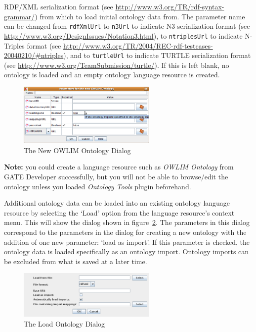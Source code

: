 \begin{itemize}
  RDF/XML serialization format (see \url{http://www.w3.org/TR/rdf-syntax-grammar/}) from which
  to load initial ontology data from. The parameter name can be changed
  from \texttt{rdfXmlUrl} to \texttt{n3Url} to indicate N3 serialization
  format (see \url{http://www.w3.org/DesignIssues/Notation3.html}), 
  to \texttt{ntriplesUrl}  to indicate N-Triples format 
  (see \url{http://www.w3.org/TR/2004/REC-rdf-testcases-20040210/#ntriples}), 
  and to \texttt{turtleUrl} to indicate TURTLE serialization format
  (see \url{http://www.w3.org/TeamSubmission/turtle/}).
  If this is left blank, no ontology is loaded and an empty ontology
  language resource is created.
\end{itemize}


\begin{figure}[!htbp]
\begin{center}
\includegraphics[width=0.6\textwidth]{ontology_lrowlim_new.png}
\caption{The New OWLIM Ontology Dialog}
\label{fig:ontology_lrowlim_new}
\end{center}
\end{figure}

\textbf{Note:} you could create a language resource such as 
\emph{OWLIM Ontology} from GATE Developer successfully, but you 
will not be able to browse/edit the ontology unless you loaded 
\emph{Ontology Tools} plugin beforehand.

Additional ontology data can be loaded into an existing ontology
language resource by selecting the `Load' option from the 
language resource's context menu. This will show the 
dialog shown in figure~\ref{fig:ontology_lr_load}.
The parameters in this dialog correspond to the parameters in the 
dialog for creating a new ontology with the addition of one new
parameter: `load as import'. If this parameter is checked, the
ontology data is loaded specifically as an ontology import. Ontology
imports can be excluded from what is saved at a later time.

\begin{figure}[!htbp]
\begin{center}
\includegraphics[width=0.6\textwidth]{ontology_lr_load.png}
\caption{The Load Ontology Dialog}
\label{fig:ontology_lr_load}
\end{center}
\end{figure}

